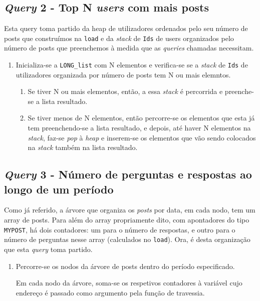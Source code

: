 \documentclass[10pt]{article}
\begin{document}
	\subsection*{\textit{Query} 2 - Top N \textit{users} com mais posts}
			Esta query toma partido da heap de utilizadores ordenados pelo seu número de posts
		que construímos na \texttt{load} e da \textit{stack} de \texttt{Ids} de users
		organizados pelo número de posts que preenchemos à medida que as \textit{queries}
		chamadas necessitam. 
		\begin{enumerate}
			\item Inicializa-se a \texttt{LONG\_list} com N elementos e verifica-se se a
			\textit{stack} de \texttt{Ids} de utilizadores organizada por número de posts 
			tem N ou mais elemntos.
			\begin{enumerate}
				\item Se tiver N ou mais elementos, então, a essa \textit{stack} é percorrida
				e preenche-se a lista resultado.
				\item Se tiver menos de N elementos, então percorre-se os elementos que esta
				já tem preenchendo-se a lista resultado, e depois, até haver N elementos na
				\textit{stack}, faz-se \textit{pop} à \textit{heap} e inserem-se os elementos
				que vão sendo colocados na \textit{stack} também na lista resultado.
			\end{enumerate}
		\end{enumerate}			
	\subsection*{\textit{Query} 3 - Número de perguntas e respostas ao longo de um período}
			Como já referido, a árvore que organiza os \textit{posts} por data, em cada nodo,
		tem um array de posts. Para além do array propriamente dito, com apontadores do tipo
		\texttt{MYPOST}, há dois contadores: um para o número de respostas, e outro para o
		número de perguntas nesse array (calculados no \texttt{load}). Ora, é desta organização
		que esta \textit{query} toma partido.
		\begin{enumerate}
			\item Percorre-se os nodos da árvore de posts dentro do período especificado.
			
				Em cada nodo da árvore, soma-se os respetivos contadores à variável cujo 
			endereço é passado como argumento pela função de travessia.
		\end{enumerate}
\end{document}
